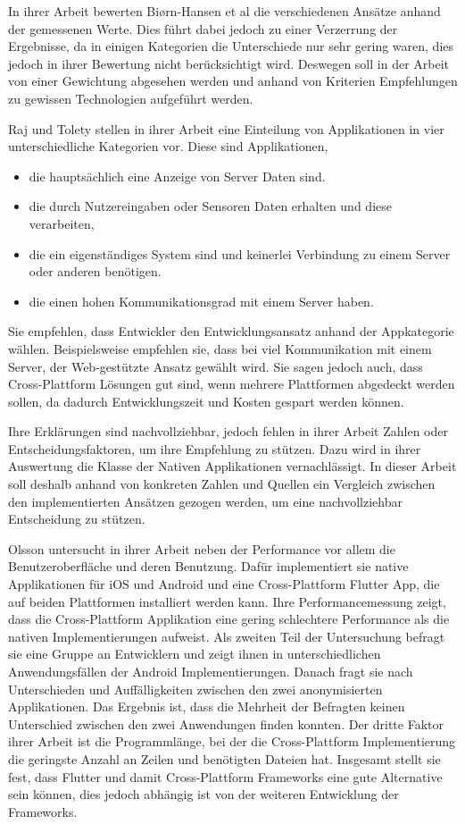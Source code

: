 In ihrer Arbeit bewerten Biørn-Hansen et al die verschiedenen Ansätze anhand der gemessenen Werte. Dies führt dabei jedoch zu einer Verzerrung der Ergebnisse, da in einigen Kategorien die Unterschiede nur sehr gering waren, dies jedoch in ihrer Bewertung nicht berücksichtigt wird. Deswegen soll in der Arbeit von einer Gewichtung abgesehen werden und anhand von Kriterien Empfehlungen zu gewissen Technologien aufgeführt werden.

Raj und Tolety \cite{IEEE_Rahul_Seshu} stellen in ihrer Arbeit eine Einteilung von Applikationen in vier unterschiedliche Kategorien vor. Diese sind Applikationen,
\begin{itemize}
    \item die hauptsächlich eine Anzeige von Server Daten sind.
    \item die durch Nutzereingaben oder Sensoren Daten erhalten und diese verarbeiten,
    \item die ein eigenständiges System sind und keinerlei Verbindung zu einem Server oder anderen benötigen.
    \item die einen hohen Kommunikationsgrad mit einem Server haben.
\end{itemize}
Sie empfehlen, dass Entwickler den Entwicklungsansatz anhand der Appkategorie wählen. Beispielsweise empfehlen sie, dass bei viel Kommunikation mit einem Server, der Web-gestützte Ansatz gewählt wird. Sie sagen jedoch auch, dass Cross-Plattform Lösungen gut sind, wenn mehrere Plattformen abgedeckt werden sollen, da dadurch Entwicklungszeit und Kosten gespart werden können.

Ihre Erklärungen sind nachvollziehbar, jedoch fehlen in ihrer Arbeit Zahlen oder Entscheidungsfaktoren, um ihre Empfehlung zu stützen. Dazu wird in ihrer Auswertung die Klasse der Nativen Applikationen vernachlässigt. In dieser Arbeit soll deshalb anhand von konkreten Zahlen und Quellen ein Vergleich zwischen den implementierten Ansätzen gezogen werden, um eine nachvollziehbar Entscheidung zu stützen.

Olsson \cite{Olsson_2020} untersucht in ihrer Arbeit neben der Performance vor allem die Benutzeroberfläche und deren Benutzung. Dafür implementiert sie native Applikationen für iOS und Android und eine Cross-Plattform Flutter App, die auf beiden Plattformen installiert werden kann. Ihre Performancemessung zeigt, dass die Cross-Plattform Applikation eine gering schlechtere Performance als die nativen Implementierungen aufweist. Als zweiten Teil der Untersuchung befragt sie eine Gruppe an Entwicklern und zeigt ihnen in unterschiedlichen Anwendungsfällen der Android Implementierungen. Danach fragt sie nach Unterschieden und Auffälligkeiten zwischen den zwei anonymisierten Applikationen. Das Ergebnis ist, dass die Mehrheit der Befragten keinen Unterschied zwischen den zwei Anwendungen finden konnten. Der dritte Faktor ihrer Arbeit ist die Programmlänge, bei der die Cross-Plattform Implementierung die geringste Anzahl an Zeilen und benötigten Dateien hat. Insgesamt stellt sie fest, dass Flutter und damit Cross-Plattform Frameworks eine gute Alternative sein können, dies jedoch abhängig ist von der weiteren Entwicklung der Frameworks.

